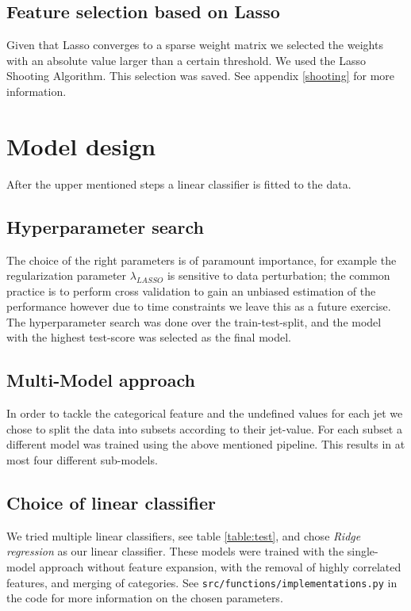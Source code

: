 \documentclass[a4paper, 10pt, conference]{ieeeconf}      %
\begin{document}
\subsection{Feature selection based on Lasso}

Given that Lasso converges to a sparse weight matrix we selected the weights
with an absolute value larger than a certain threshold. We used the Lasso
Shooting Algorithm\cite{Machine_learning_book}. This selection was saved. See appendix \ref{shooting} for more information.

\section{Model design}

After the upper mentioned steps a linear classifier is fitted to the data.

\subsection{Hyperparameter search}

The choice of the right parameters is of paramount importance, for example the
regularization parameter $\lambda_{LASSO}$ is sensitive to data perturbation;
the common practice is to perform cross validation to gain an unbiased
estimation of the performance however due to time constraints we leave this as
a future exercise. The hyperparameter search was done over the train-test-split,
and the model with the highest test-score was selected as the final model.

\subsection{Multi-Model approach}\label{subsection:multimodel}

In order to tackle the categorical feature and the undefined values for each
jet we chose to split the data into subsets according to their jet-value. For
each subset a different model was trained using the above mentioned pipeline.
This results in at most four different sub-models.

\subsection{Choice of linear classifier}

We tried multiple linear classifiers, see table \ref{table:test}, and chose \textit{Ridge regression} as our linear classifier. These models were trained with the single-model approach without feature expansion, with the removal of highly correlated features, and merging of categories. See \texttt{src/functions/implementations.py} in the code for more information on the chosen parameters.
\end{document}
